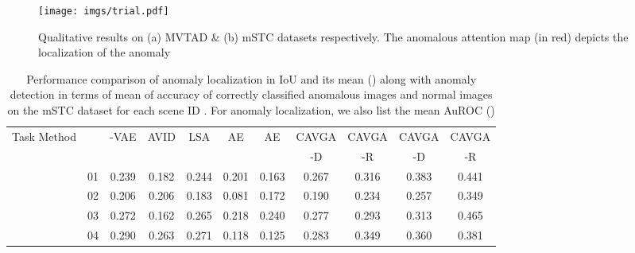 \documentclass[runningheads]{llncs}
\begin{document}
\begin{figure}[h!]
\centering

\texttt{[image: imgs/trial.pdf]}
\caption{
Qualitative results on (a) MVTAD \& (b) mSTC datasets respectively. The anomalous attention map (in red) depicts the localization of the anomaly}

\label{qual_mvtec}
\end{figure}

\begin{table}[h!]
\begin{center}
\renewcommand{\arraystretch}{.8}
\setlength{\tabcolsep}{1.6pt}
\caption{Performance comparison of anomaly localization in IoU and its mean () along with anomaly detection in terms of mean of accuracy of correctly classified anomalous images and normal images on the mSTC dataset for each scene ID . For anomaly localization, we also list the mean AuROC ()}
\label{table_iou_st}
\scriptsize
\begin{tabular}{ccccccccccc}
\toprule
		  Task  Method & & \scriptsize -VAE &\scriptsize AVID &\scriptsize LSA &\scriptsize AE &\scriptsize AE &\scriptsize CAVGA &\scriptsize CAVGA &\scriptsize CAVGA      &\scriptsize CAVGA \\
		   & & \cite{dehaene2020iterative} &\cite{sabokrou2018avid} & \cite{abati2019latent} & \cite{bergmann2018improving} &\cite{bergmann2018improving} &-D &-R  &-D      &-R \\
		  
\midrule
		& 01 &\cellcolor{blue!30}0.239 &\cellcolor{blue!10}0.182 &\cellcolor{blue!40}0.244  &\cellcolor{blue!20}0.201  &\cellcolor{blue!5}0.163  &\cellcolor{blue!50}0.267 &\cellcolor{blue!60}0.316   &\cellcolor{blue!70}0.383 &\cellcolor{blue!80}\color{white}0.441 \\
		& 02 &\cellcolor{blue!50}0.206  &\cellcolor{blue!50}0.206  &\cellcolor{blue!30}0.183  &\cellcolor{blue!10}0.081  &\cellcolor{blue!20}0.172  &\cellcolor{blue!40}0.190  &\cellcolor{blue!60}0.234   &\cellcolor{blue!70}0.257 &\cellcolor{blue!80}\color{white}0.349 \\
		& 03 &\cellcolor{blue!40}0.272  &\cellcolor{blue!10}0.162  &\cellcolor{blue!30}0.265  &\cellcolor{blue!15}0.218  &\cellcolor{blue!25}0.240  &\cellcolor{blue!50}0.277  &\cellcolor{blue!60}0.293  &\cellcolor{blue!70}0.313 &\cellcolor{blue!80}\color{white}0.465 \\
		& 04  &\cellcolor{blue!50}0.290  &\cellcolor{blue!20}0.263  &\cellcolor{blue!30}0.271  &\cellcolor{blue!5}0.118  &\cellcolor{blue!10}0.125  &\cellcolor{blue!40}0.283  &\cellcolor{blue!60}0.349  &\cellcolor{blue!70}0.360 &\cellcolor{blue!80}\color{white}0.381 \\
		

\end{tabular}
\end{center}
\end{table}
\end{document}
